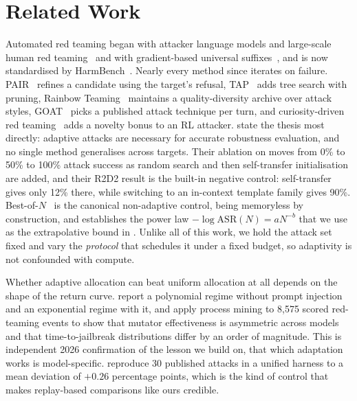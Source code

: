\section{Related Work}
\label{sec:related}

 Automated red teaming began with attacker language models and large-scale
human red teaming~\cite{perez2022redteaming,ganguli2022redteaming} and with gradient-based universal
suffixes~\cite{zou2023gcg}, and is now standardised by HarmBench~\cite{mazeika2024harmbench}. Nearly
every method since iterates on failure.
PAIR~\cite{chao2023pair} refines a candidate using the target's refusal, TAP~\cite{mehrotra2023tap}
adds tree search with pruning, Rainbow Teaming~\cite{samvelyan2024rainbow} maintains a
quality-diversity archive over attack styles, GOAT~\cite{pavlova2024goat} picks a published attack
technique per turn, and curiosity-driven red teaming~\cite{hong2024curiosity} adds a novelty bonus
to an RL attacker. \citet{andriushchenko2024adaptive} state the thesis most directly: adaptive
attacks are necessary for accurate robustness evaluation, and no single method generalises across
targets. Their ablation on \llamaseven moves from 0\% to 50\% to 100\% attack success as random
search and then self-transfer initialisation are added, and their R2D2 result is the built-in
negative control: self-transfer gives only 12\% there, while switching to an in-context template
family gives 90\%. Best-of-$N$~\cite{hughes2024bon} is the canonical non-adaptive control, being
memoryless by construction, and establishes the power law $-\log \mathrm{ASR}(N) = aN^{-b}$ that
we use as the extrapolative bound in . Unlike all of this work, we hold the
attack set fixed and vary the \emph{protocol} that schedules it under a fixed budget, so
adaptivity is not confounded with compute.

 Whether adaptive allocation can beat uniform allocation at
all depends on the shape of the return curve. \citet{halder2026scaling} report a polynomial regime
without prompt injection and an exponential regime with it, and \citet{topol2026process} apply
process mining to 8{,}575 scored red-teaming events to show that mutator effectiveness is asymmetric
across models and that time-to-jailbreak distributions differ by an order of magnitude. This is
independent 2026 confirmation of the lesson we build on, that which adaptation works is
model-specific. \citet{fang2026foundry} reproduce 30 published attacks in a unified harness to a
mean deviation of $+0.26$ percentage points, which is the kind of control that makes replay-based
comparisons like ours credible.

